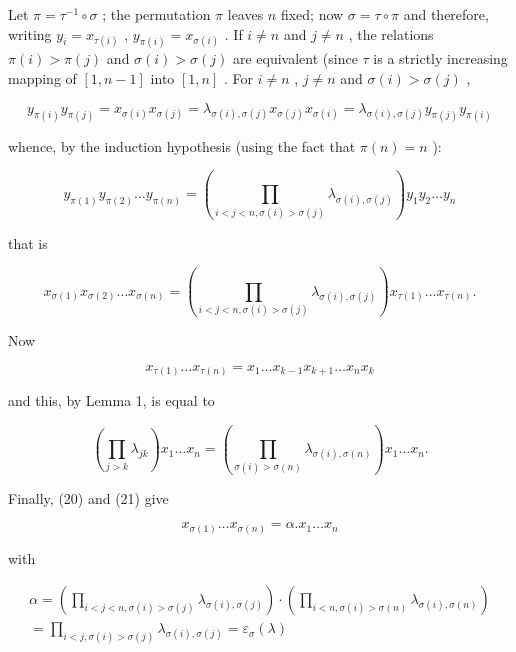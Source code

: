 Let \(\pi = \tau^{-1} \circ \sigma\) ; the permutation \(\pi\) leaves \(n\) fixed; now \(\sigma = \tau \circ \pi\) and therefore, writing \(y_i = x_{\tau(i)}\) , \(y_{\pi(i)} = x_{\sigma(i)}\) . If \(i \neq n\) and \(j \neq n\) , the relations \(\pi(i) > \pi(j)\) and \(\sigma(i) > \sigma(j)\) are equivalent (since \(\tau\) is a strictly increasing mapping of \([1, n - 1]\) into \([1, n]\) . For \(i \neq n\) , \(j \neq n\) and \(\sigma(i) > \sigma(j)\) ,

\[
y _ {\pi (i)} y _ {\pi (j)} = x _ {\sigma (i)} x _ {\sigma (j)} = \lambda_ {\sigma (i), \sigma (j)} x _ {\sigma (j)} x _ {\sigma (i)} = \lambda_ {\sigma (i), \sigma (j)} y _ {\pi (j)} y _ {\pi (i)}
\]

whence, by the induction hypothesis (using the fact that \(\pi(n) = n\) ):

\[
y _ {\pi (1)} y _ {\pi (2)} \dots y _ {\pi (n)} = \left(\prod_ {i <   j <   n, \sigma (i) > \sigma (j)} \lambda_ {\sigma (i), \sigma (j)}\right) y _ {1} y _ {2} \dots y _ {n}
\]

that is

\[
x _ {\sigma (1)} x _ {\sigma (2)} \dots x _ {\sigma (n)} = \left(\prod_ {i <   j <   n, \sigma (i) > \sigma (j)} \lambda_ {\sigma (i), \sigma (j)}\right) x _ {\tau (1)} \dots x _ {\tau (n)}.\tag{20}
\]

Now

\[
x _ {\tau (1)} \dots x _ {\tau (n)} = x _ {1} \dots x _ {k - 1} x _ {k + 1} \dots x _ {n} x _ {k}
\]

and this, by Lemma 1, is equal to

\[
\left(\prod_ {j > k} \lambda_ {j k}\right) x _ {1} \dots x _ {n} = \left(\prod_ {\sigma (i) > \sigma (n)} \lambda_ {\sigma (i), \sigma (n)}\right) x _ {1} \dots x _ {n}.\tag{21}
\]

Finally, (20) and (21) give

\[
x _ {\sigma (1)} \dots x _ {\sigma (n)} = \alpha . x _ {1} \dots x _ {n}
\]

with

\[
\begin{array}{l} \alpha = \left(\prod_ {i <   j <   n, \sigma (i) > \sigma (j)} \lambda_ {\sigma (i), \sigma (j)}\right) \cdot \left(\prod_ {i <   n, \sigma (i) > \sigma (n)} \lambda_ {\sigma (i), \sigma (n)}\right) \\ = \prod_ {i <   j, \sigma (i) > \sigma (j)} \lambda_ {\sigma (i), \sigma (j)} = \varepsilon_ {\sigma} (\lambda) \end{array}
\]

